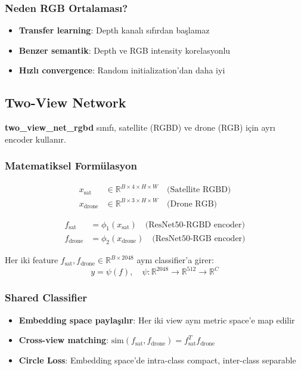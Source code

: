 \documentclass[12pt,a4paper]{article}
\begin{document}
\subsubsection{Neden RGB Ortalaması?}
\begin{itemize}
    \item \textbf{Transfer learning}: Depth kanalı sıfırdan başlamaz
    \item \textbf{Benzer semantik}: Depth ve RGB intensity korelasyonlu
    \item \textbf{Hızlı convergence}: Random initialization'dan daha iyi
\end{itemize}

\subsection{Two-View Network}

\textbf{two\_view\_net\_rgbd} sınıfı, satellite (RGBD) ve drone (RGB) için ayrı encoder kullanır.

\subsubsection{Matematiksel Formülasyon}
\begin{align}
    x_{\text{sat}} &\in \mathbb{R}^{B \times 4 \times H \times W} \quad \text{(Satellite RGBD)} \\
    x_{\text{drone}} &\in \mathbb{R}^{B \times 3 \times H \times W} \quad \text{(Drone RGB)}
\end{align}

\begin{align}
    f_{\text{sat}} &= \phi_1(x_{\text{sat}}) \quad \text{(ResNet50-RGBD encoder)} \\
    f_{\text{drone}} &= \phi_2(x_{\text{drone}}) \quad \text{(ResNet50-RGB encoder)}
\end{align}

Her iki feature $f_{\text{sat}}, f_{\text{drone}} \in \mathbb{R}^{B \times 2048}$ aynı classifier'a girer:
\begin{equation}
    y = \psi(f), \quad \psi: \mathbb{R}^{2048} \to \mathbb{R}^{512} \to \mathbb{R}^{C}
\end{equation}

\subsubsection{Shared Classifier}
\begin{itemize}
    \item \textbf{Embedding space paylaşılır}: Her iki view aynı metric space'e map edilir
    \item \textbf{Cross-view matching}: $\text{sim}(f_{\text{sat}}, f_{\text{drone}}) = f_{\text{sat}}^T f_{\text{drone}}$
    \item \textbf{Circle Loss}: Embedding space'de intra-class compact, inter-class separable
\end{itemize}
\end{document}

